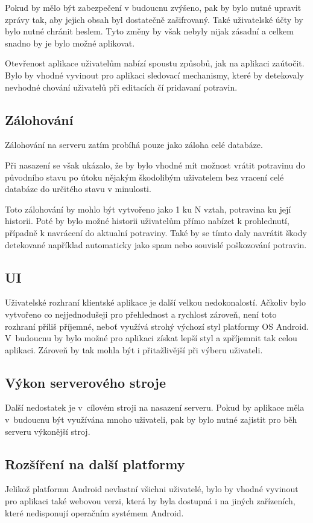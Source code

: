 \documentclass[thesis=B,czech]{FITthesis}[2013/10/20]
\begin{document}
\begin{conclusion}
Pokud by mělo být zabezpečení v budoucnu zvýšeno, pak by bylo nutné upravit zprávy tak, aby jejich obsah byl dostatečně zašifrovaný. Také uživatelské účty by bylo nutné chránit heslem. Tyto změny by však nebyly nijak zásadní a celkem snadno by je bylo možné aplikovat.

Otevřenost aplikace uživatelům nabízí spoustu způsobů, jak na aplikaci zaútočit. Bylo by vhodné vyvinout pro aplikaci sledovací mechanismy, které by detekovaly nevhodné chování uživatelů při editacích čí pridavaní potravin.

\subsection{Zálohování}
Zálohování na serveru zatím probíhá pouze jako záloha celé databáze.

Při nasazení se však ukázalo, že by bylo vhodné mít možnost vrátit potravinu do původního stavu po útoku nějakým škodolibým uživatelem bez vracení celé databáze do určitého stavu v minulosti.

Toto zálohování by mohlo být vytvořeno jako 1 ku N vztah, potravina ku její historii. Poté by bylo možné historii uživatelům přímo nabízet k prohlednutí, případně k navrácení do aktualní potraviny. Také by se tímto daly navrátit škody detekované například automaticky jako spam nebo souvislé poškozování potravin.

\subsection{UI}
Uživatelské rozhraní klientské aplikace je další velkou nedokonalostí. Ačkoliv bylo vytvořeno co nejjednodušeji pro přehlednost a rychlost zároveň, není toto rozhraní příliš příjemné, neboť využívá strohý výchozí styl platformy OS Android. V~budoucnu by bylo možné pro aplikaci získat lepší styl a zpříjemnit tak celou aplikaci. Zároveň by tak mohla být i přitažlivější při výberu uživateli.

\subsection{Výkon serverového stroje}
Další nedostatek je v~cílovém stroji na nasazení serveru. Pokud by aplikace měla v~budoucnu být využívána mnoho uživateli, pak by bylo nutné zajistit pro běh serveru výkonější stroj.

\subsection{Rozšíření na další platformy}
Jelikož platformu Android nevlastní všichni uživatelé, bylo by vhodné vyvinout pro aplikaci také webovou verzi, která by byla dostupná i na jiných zařízeních, které nedisponují operačním systémem Android.

\end{conclusion}
\end{document}
